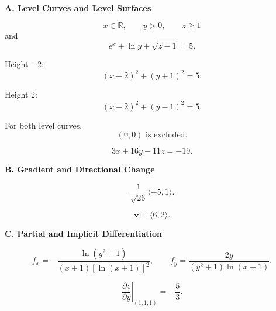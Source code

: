 \documentclass[10pt]{article}
\newcommand{\answerbar}[1]{%
  \vspace{0.30em}%
  \noindent\colorbox{sectiongray}{%
    \parbox{\dimexpr\textwidth-2\fboxsep\relax}{%
      \strut\textbf{#1}\strut
    }%
  }%
  \par\vspace{0.30em}%
}
\begin{document}

\answerbar{A. Level Curves and Level Surfaces}

\begin{parts}

\item
\[
\boxed{
x\in\mathbb R,\qquad y>0,\qquad z\ge1
}
\]
and
\[
\boxed{
e^x+\ln y+\sqrt{z-1}=5
}.
\]

\item Height $-2$:
\[
\boxed{(x+2)^2+(y+1)^2=5}.
\]

Height $2$:
\[
\boxed{(x-2)^2+(y-1)^2=5}.
\]

For both level curves,
\[
\boxed{(0,0)\text{ is excluded}}.
\]

\item
\[
\boxed{3x+16y-11z=-19}.
\]

\end{parts}


\answerbar{B. Gradient and Directional Change}

\begin{parts}

\item
\[
\boxed{
\frac1{\sqrt{26}}\langle-5,1\rangle
}.
\]

\item
\[
\boxed{\mathbf v=\langle6,2\rangle}.
\]

\end{parts}


\answerbar{C. Partial and Implicit Differentiation}

\begin{parts}

\item
\[
\boxed{
f_x=
-\frac{\ln(y^2+1)}
{(x+1)[\ln(x+1)]^2}
},
\qquad
\boxed{
f_y=
\frac{2y}
{(y^2+1)\ln(x+1)}
}.
\]

\item
\[
\boxed{
\left.
\frac{\partial z}{\partial y}
\right|_{(1,1,1)}
=
-\frac53
}.
\]

\end{parts}
\end{document}
